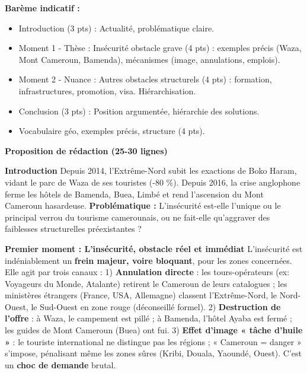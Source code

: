 \documentclass[11pt]{article}
\begin{document}
\begin{corrige}

\textbf{Barème indicatif :}
\begin{itemize}
\item Introduction (3 pts) : Actualité, problématique claire.
\item Moment 1 - Thèse : Insécurité obstacle grave (4 pts) : exemples précis (Waza, Mont Cameroun, Bamenda), mécanismes (image, annulations, emplois).
\item Moment 2 - Nuance : Autres obstacles structurels (4 pts) : formation, infrastructures, promotion, visa. Hiérarchisation.
\item Conclusion (3 pts) : Position argumentée, hiérarchie des solutions.
\item Vocabulaire géo, exemples précis, structure (4 pts).
\end{itemize}

\textbf{Proposition de rédaction (25-30 lignes)}

\textbf{Introduction}
Depuis 2014, l'Extrême-Nord subit les exactions de Boko Haram, vidant le parc de Waza de ses touristes (-80 \%). Depuis 2016, la crise anglophone ferme les hôtels de Bamenda, Buea, Limbé et rend l'ascension du Mont Cameroun hasardeuse. \textbf{Problématique :} L'insécurité est-elle l'unique ou le principal verrou du tourisme camerounais, ou ne fait-elle qu'aggraver des faiblesses structurelles préexistantes ?

\textbf{Premier moment : L'insécurité, obstacle réel et immédiat}
L'insécurité est indéniablement un \textbf{frein majeur, voire bloquant}, pour les zones concernées. Elle agit par trois canaux : 1) \textbf{Annulation directe} : les tours-opérateurs (ex: Voyageurs du Monde, Atalante) retirent le Cameroun de leurs catalogues ; les ministères étrangers (France, USA, Allemagne) classent l'Extrême-Nord, le Nord-Ouest, le Sud-Ouest en zone rouge (déconseillé formel). 2) \textbf{Destruction de l'offre} : à Waza, le campement est pillé ; à Bamenda, l'hôtel Ayaba est fermé ; les guides de Mont Cameroun (Buea) ont fui. 3) \textbf{Effet d'image « tâche d'huile »} : le touriste international ne distingue pas les régions ; « Cameroun = danger » s'impose, pénalisant même les zones sûres (Kribi, Douala, Yaoundé, Ouest). C'est un \textbf{choc de demande} brutal.


\end{corrige}
\end{document}
